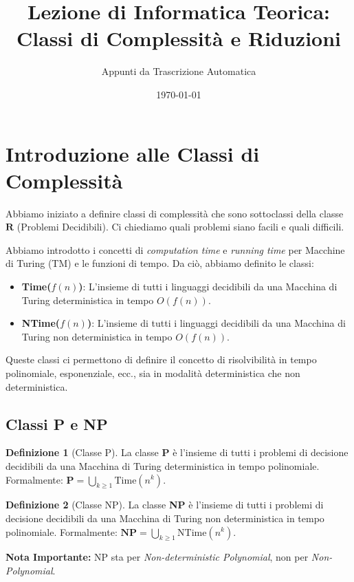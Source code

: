 \documentclass[a4paper]{article}
\title{Lezione di Informatica Teorica: Classi di Complessità e Riduzioni}
\author{Appunti da Trascrizione Automatica}
\date{\today}
\theoremstyle{definition} %
\newtheorem{definition}{Definizione}
\begin{document}
\maketitle
\tableofcontents
\newpage

\section{Introduzione alle Classi di Complessità}

Abbiamo iniziato a definire classi di complessità che sono sottoclassi della classe $\mathbf{R}$ (Problemi Decidibili). Ci chiediamo quali problemi siano facili e quali difficili.

Abbiamo introdotto i concetti di \emph{computation time} e \emph{running time} per Macchine di Turing (TM) e le funzioni di tempo. Da ciò, abbiamo definito le classi:
\begin{itemize}
    \item \textbf{Time($f(n)$)}: L'insieme di tutti i linguaggi decidibili da una Macchina di Turing deterministica in tempo $O(f(n))$.
    \item \textbf{NTime($f(n)$)}: L'insieme di tutti i linguaggi decidibili da una Macchina di Turing non deterministica in tempo $O(f(n))$.
\end{itemize}

Queste classi ci permettono di definire il concetto di risolvibilità in tempo polinomiale, esponenziale, ecc., sia in modalità deterministica che non deterministica.

\subsection{Classi P e NP}

\begin{definition}[Classe P]
La classe \textbf{P} è l'insieme di tutti i problemi di decisione decidibili da una Macchina di Turing deterministica in tempo polinomiale.
Formalmente: $\mathbf{P} = \bigcup_{k \ge 1} \text{Time}(n^k)$.
\end{definition}

\begin{definition}[Classe NP]
La classe \textbf{NP} è l'insieme di tutti i problemi di decisione decidibili da una Macchina di Turing non deterministica in tempo polinomiale.
Formalmente: $\mathbf{NP} = \bigcup_{k \ge 1} \text{NTime}(n^k)$.
\end{definition}

\textbf{Nota Importante:} NP sta per \emph{Non-deterministic Polynomial}, non per \emph{Non-Polynomial}.
\end{document}
